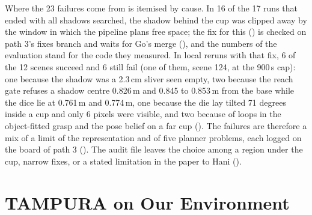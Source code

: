 Where the 23 failures come from is itemised by cause. In 16 of the 17
runs that ended with all shadows searched, the shadow behind the cup was clipped away by the
window in which the pipeline plans free space; the fix for this () is
checked on path 3's fixes branch and waits for Go's merge (), and the numbers of
the evaluation stand for the code they measured. In local reruns with that fix, 6 of the
12 scenes succeed and 6 still fail (one of them, scene 124, at the 900\,s cap): one because the shadow was a 2.3\,cm sliver
seen empty, two because the reach gate refuses a shadow centre 0.826\,m and 0.845
to 0.853\,m from the base while the dice lie at 0.761\,m and 0.774\,m, one because
the die lay tilted 71 degrees inside a cup and only 6 pixels were visible, and two
because of loops in the object-fitted grasp and the pose belief on a far cup
(). The failures are therefore a mix of a limit of the representation and of
five planner problems, each logged on the board of path 3 (). The audit file
leaves the choice among a region under the cup, narrow fixes, or a stated
limitation in the paper to Hani ().

\section{TAMPURA on Our Environment}
\label{sec:reverse}

